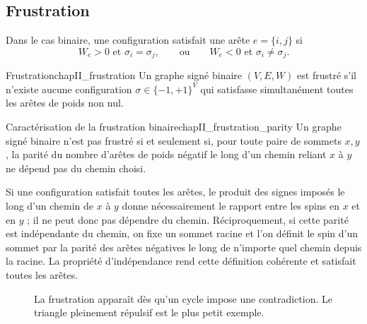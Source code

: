 \subsection{Frustration}

Dans le cas binaire, une configuration satisfait une arête $e=\{i,j\}$ si
\[
    W_e>0\text{ et }\sigma_i=\sigma_j,
    \qquad\text{ou}\qquad
    W_e<0\text{ et }\sigma_i\neq\sigma_j.
\]

\begin{Definition}{Frustration}{chapII_frustration}
Un graphe signé binaire $(V,E,W)$ est frustré s'il n'existe aucune configuration $\sigma\in\{-1,+1\}^V$ qui satisfasse simultanément toutes les arêtes de poids non nul.
\end{Definition}

\begin{Fait}{Caractérisation de la frustration binaire}{chapII_frustration_parity}
Un graphe signé binaire n'est pas frustré si et seulement si, pour toute paire de sommets $x,y$, la parité du nombre d'arêtes de poids négatif le long d'un chemin reliant $x$ à $y$ ne dépend pas du chemin choisi.
\end{Fait}

\begin{Preuve}
Si une configuration satisfait toutes les arêtes, le produit des signes imposés le long d'un chemin de $x$ à $y$ donne nécessairement le rapport entre les spins en $x$ et en $y$ ; il ne peut donc pas dépendre du chemin. Réciproquement, si cette parité est indépendante du chemin, on fixe un sommet racine et l'on définit le spin d'un sommet par la parité des arêtes négatives le long de n'importe quel chemin depuis la racine. La propriété d'indépendance rend cette définition cohérente et satisfait toutes les arêtes.
\end{Preuve}

\begin{figure}[H]
\centering
{}
\caption{La frustration apparaît dès qu'un cycle impose une contradiction. Le triangle pleinement répulsif est le plus petit exemple.}
\label{fig:chapII_frustration_triangle}
\end{figure}

